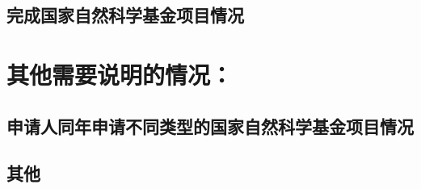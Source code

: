 \documentclass[UTF8,zihao=-4]{ctexart} %
\begin{document}
  \subsection[（对申请人负责的前一个已资助期满的科学基金项目（项目名称及批准号）完成情况、后续研究进展及与本申请项目的关系加以详细说明。另附该项目的研究工作总结摘要（限500字）和相关成果详细目录）。]{完成国家自然科学基金项目情况}
  \section{其他需要说明的情况：}
  \subsection[（列明同年申请的其他项目的项目类型、项目名称信息，并说明与本项目之间的区别与联系；已收到自然科学基金委不予受理或不予资助决定的，无需列出）。]{申请人同年申请不同类型的国家自然科学基金项目情况}
  \subsection[具有高级专业技术职务（职称）的申请人或者主要参与者是否存在同年申请或者参与申请国家自然科学基金项目的单位不一致的情况；如存在上述情况，列明所涉及人员的姓名，申请或参与申请的其他项目的项目类型、项目名称、单位名称、上述人员在该项目中是申请人还是参与者，并说明单位不一致原因。]{}
  \subsection[具有高级专业技术职务（职称）的申请人或者主要参与者是否存在与正在承担的国家自然科学基金项目的单位不一致的情况；如存在上述情况，列明所涉及人员的姓名，正在承担项目的批准号、项目类型、项目名称、单位名称、起止年月，并说明单位不一致原因。]{}
  \subsection[申请人和主要参与者同年以不同专业技术职务（职称）申请或参与申请科学基金项目的情况（应详细说明原因）。]{}
  \subsection[申请人在撰写本申请书时使用生成式人工智能的情况，请详细说明申请书中使用的位置和内容。]{}
  \subsection[（包括但不限于使用以他人名义申报过的申请书；如有，请详细说明）。]{其他}
  \mnsfcWordCount
\end{document}
